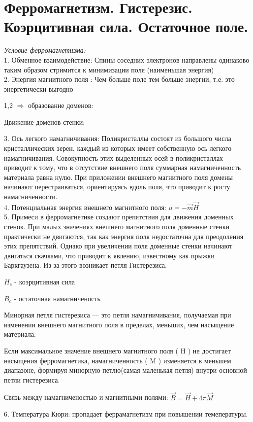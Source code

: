 \section{Ферромагнетизм. Гистерезис. Коэрцитивная сила. Остаточное поле.}

\textit{Условие ферромагнетизма:} \\

1. Обменное взаимодействие: Спины соседних электронов направлены одинаково таким образом стримится к минимизации поля (наименьшая энергия) \\
2. Энергия магнитного поля : Чем больше поле тем больше энергии, т.е. это энергетически выгодно 

1,2 \( \Rightarrow \) образование доменов: 


\newpage

Движение доменов стенки:


3. Ось легкого намагничивания: Поликристаллы состоят из большого числа кристаллических зерен, каждый из которых имеет собственную ось легкого намагничивания. Совокупность этих выделенных осей в поликристаллах приводит к тому, что в отсутствие внешнего поля суммарная намагниченность материала равна нулю. При приложении внешнего магнитного поля домены начинают перестраиваться, ориентируясь вдоль поля, что приводит к росту намагниченности. \\
4. Потенциальная энергия внешнего магнитного поля: \( u=-\vec{m}\vec{H} \) \\
5. Примеси в ферромагнетике создают препятствия для движения доменных стенок. При малых значениях внешнего магнитного поля доменные стенки практически не двигаются, так как энергия поля недостаточна для преодоления этих препятствий. Однако при увеличении поля доменные стенки начинают двигаться скачками, что приводит к явлению, известному как прыжки Баркгаузена. 
Из-за этого возникает петля Гистерезиса.


\( H_c \) - коэрцитивная сила

\( B_c \) - остаточная намагниченость 

Минорная петля гистерезиса — это петля намагничивания, получаемая при изменении внешнего магнитного поля в пределах, меньших, чем насыщение материала.

Если максимальное значение внешнего магнитного поля ( H ) не достигает насыщения ферромагнетика, намагниченность ( M ) изменяется в меньшем диапазоне, формируя минорную петлю(самая маленькая петля) внутри основной  петли гистерезиса.

Связь между намагниченостью и магнитными полями: \( \vec{B}=\vec{H}+4\pi \vec{M} \) 

6. Температура Кюри: пропадает феррамагнетизм при повышении темепературы.

